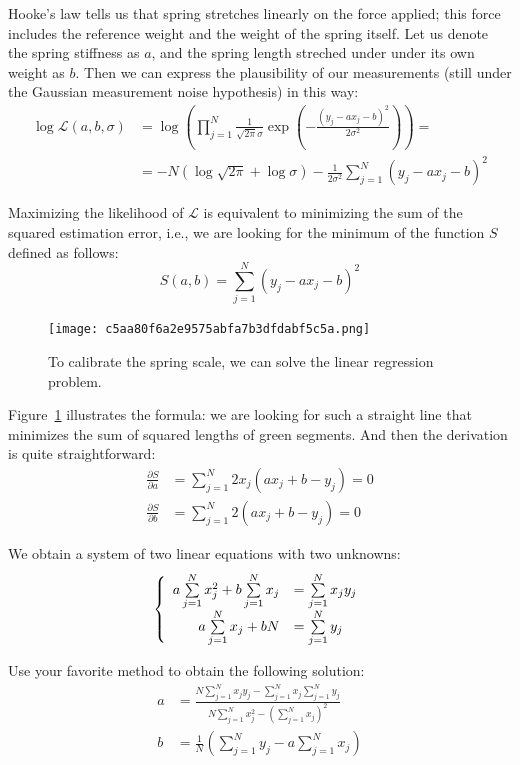 \documentclass[notitlepage,oneside]{book}
\begin{document}
Hooke's law tells us that spring stretches linearly on the force applied;
this force includes the reference weight and the weight of the spring itself. 
Let us denote the spring stiffness as $a$, and the spring length streched under under its own weight as $b$. 
Then we can express the plausibility of our measurements (still under the Gaussian measurement noise hypothesis) in this way:
\begin{align*}
\log \mathcal{L}(a, b,\sigma) & = \log \left(\prod\limits_{j=1}^N  \frac{1}{\sqrt{2\pi}\sigma} \exp\left(-\frac{(y_j - a x_j - b)^2}{2\sigma^2}\right)\right) =\\
& = -N \left(\log\sqrt{2\pi} + \log\sigma\right) - \frac{1}{2\sigma^2} \sum\limits_{j=1}^N (y_j- a x_j - b)^2
\end{align*}

Maximizing the likelihood of $\mathcal L$ is equivalent to minimizing the sum of the squared estimation error, i.e., we are looking for the minimum of the function $S$ defined as follows:
$$
S(a, b) = \sum\limits_{j=1}^N (y_j- a x_j - b)^2
$$


\begin{figure}[htb!]
\centering
\texttt{[image: c5aa80f6a2e9575abfa7b3dfdabf5c5a.png]}
\caption{To calibrate the spring scale, we can solve the linear regression problem.}
\label{fig:regression}
\end{figure}

Figure~\ref{fig:regression} illustrates the formula: we are looking for such a straight line that minimizes the sum of squared lengths of green segments.
And then the derivation is quite straightforward:
\begin{align*}
\frac{\partial S}{\partial a} &= \sum\limits_{j=1}^N 2 x_j (a x_j + b - y_j) = 0 \\
\frac{\partial S}{\partial b} &= \sum\limits_{j=1}^N 2 (a x_j + b - y_j) = 0
\end{align*}

We obtain a system of two linear equations with two unknowns:
$$
\left \{ \begin{array}{r l}
a \sum\limits_{j=1}^N x_j^2 + b \sum\limits_{j=1}^N x_j  & = \sum\limits_{j=1}^N x_j y_j\\
a \sum\limits_{j=1}^N x_j   + b N                        & = \sum\limits_{j=1}^N y_j
\end{array} \right.
$$

Use your favorite method to obtain the following solution:
\begin{align*}
a &= \frac{N \sum\limits_{j=1}^N x_j y_j - \sum\limits_{j=1}^N x_j \sum\limits_{j=1}^N y_j}{N\sum\limits_{j=1}^N x_j^2 - \left(\sum\limits_{j=1}^N x_j\right)^2} \\
b &= \frac{1}{N}\left(  \sum\limits_{j=1}^N y_j - a  \sum\limits_{j=1}^N x_j \right)
\end{align*}
\end{document}

